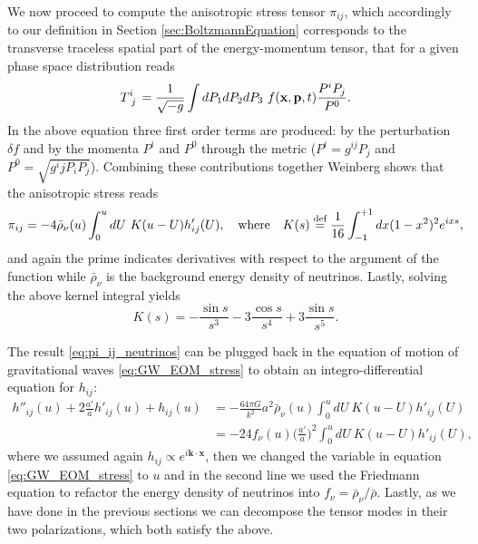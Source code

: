 We now proceed to compute the anisotropic stress tensor $\pi_{ij}$, which accordingly to our definition in Section \ref{sec:BoltzmannEquation} corresponds to the transverse traceless spatial part of the energy-momentum tensor, that for a given phase space distribution reads
\begin{align*}
    \tensor{T}{^i_j}=\frac{1}{\sqrt{- g}}\int dP_1dP_2dP_3\ f(\mathbf x,\mathbf p,t)\frac{P^iP_j}{P^0}.
\end{align*}
In the above equation three first order terms are produced: by the perturbation $\delta f$ and by the momenta $P^i$ and $P^0$ through the metric ($P^i=g^{ij}P_j$ and $P^0=\sqrt{g^ijP_iP_j}$). Combining these contributions together Weinberg \cite{Weinberg_nu_dump} shows that the anisotropic stress reads
\begin{equation}
    \pi_{ij}=-4\bar\rho_\nu(u)\int_0^u dU\ K(u-U)h'_{ij}(U),\quad \text{where}\quad K(s)\stackrel{\text{def}}{=}\frac{1}{16}\int_{-1}^{+1}dx(1-x^2)^2e^{ixs},\label{eq:pi_ij_neutrinos}
\end{equation}
and again the prime indicates derivatives with respect to the argument of the function while $\bar\rho_\nu$ is the background energy density of neutrinos. Lastly, solving the above kernel integral yields
\begin{equation*}
    K(s)=-\frac{\sin s}{s^3}-3\frac{\cos s}{s^4}+3\frac{\sin s}{s^5}.
\end{equation*}

The result \eqref{eq:pi_ij_neutrinos} can be plugged back in the equation of motion of gravitational waves \eqref{eq:GW_EOM_stress} to obtain an integro-differential equation for $h_{ij}$: 
\begin{align}
    h''_{ij}(u)+2\frac{a'}{a}h'_{ij}(u)+ h_{ij}(u)&=-\frac{64\pi G}{k^2} a^2\bar\rho_\nu(u)\int_0^u dU\ K(u-U)h'_{ij}(U)\nonumber\\
    &=-24f_\nu(u)\bigg(\frac{a'}{a}\bigg)^2\int_0^u dU\ K(u-U)h'_{ij}(U),\label{eq:GW_EOM_neutrinos}
\end{align}
where we assumed again $h_{ij}\propto e^{i\mathbf{k\cdot x}}$, then we changed the variable in equation \eqref{eq:GW_EOM_stress} to $u$ and in the second line we used the Friedmann equation to refactor the energy density of neutrinos into $f_\nu= \bar\rho_\nu/\bar\rho$. Lastly, as we have done in the previous sections we can decompose the tensor modes in their two polarizations, which both satisfy the above. 

